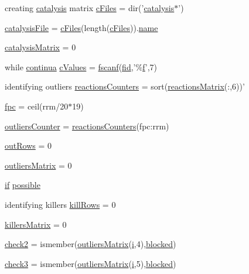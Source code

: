\begin{DoxyCompactItemize}
\item 
creating \hyperlink{a00012}{catalysis} matrix \hyperlink{a00030_a9eab57ccb42a39c704f47dc30e4f4515}{c\-Files} = dir('\hyperlink{a00012}{catalysis}$\ast$')
\item 
\hyperlink{a00030_a33e70cf5b45cb59005b82d30202f0b69}{catalysis\-File} = \hyperlink{a00030_a9eab57ccb42a39c704f47dc30e4f4515}{c\-Files}(length(\hyperlink{a00030_a9eab57ccb42a39c704f47dc30e4f4515}{c\-Files})).\hyperlink{a00027_abbf559a76fab59203496b0847ab9502a}{name}
\item 
\hyperlink{a00030_a0810027f58d6be965e44b7b84c44ace8}{catalysis\-Matrix} = 0
\item 
while \hyperlink{a00030_a9c951ebd5bc3f1adce943bee1255f4d6}{continua} \hyperlink{a00030_ad4ba7701967c1da20171228afccb7081}{c\-Values} = \hyperlink{a00025_a028ac102a731e62fb0a7439381f566c1}{fscanf}(\hyperlink{a00031_ae9011d40c6f13e68e6f07156e0da7c5d}{fid},'\%\hyperlink{a00025_a9c5a71c46b1abb8b7df5ebeac6c81535}{f}',7)
\item 
identifying outliers \hyperlink{a00030_aeea253cb98a56047ef20ceed86e2f0ea}{reactions\-Counters} = sort(\hyperlink{a00030_af998036b749d9fa6dd2365f9937279b6}{reactions\-Matrix}(\-:,6))'
\item 
\hyperlink{a00030_ab4459bcd3f7a26410560d9bd951f12bd}{fpc} = ceil(rrm/20$\ast$19)
\item 
\hyperlink{a00030_a7ec5b1f1e07b66a5d6fc972cb8b03c1f}{outliers\-Counter} = \hyperlink{a00030_aeea253cb98a56047ef20ceed86e2f0ea}{reactions\-Counters}(fpc\-:rrm)
\item 
\hyperlink{a00030_a60cfb1ca20cbbc81b85a8f56658b7c99}{out\-Rows} = 0
\item 
\hyperlink{a00030_ad8a18b407726bf44299c9bcf5d1389ff}{outliers\-Matrix} = 0
\item 
\hyperlink{a00030_a01d55766b8058903dd360b4bda71f9f5}{if} \hyperlink{a00030_a07c9e68cdbafe572c04d3112d64deb88}{possible}
\item 
identifying killers \hyperlink{a00030_a0e22d9868b850c50dfc13f5d28db8c30}{kill\-Rows} = 0
\item 
\hyperlink{a00030_a929016802e1ede2217a41240a6974fa6}{killers\-Matrix} = 0
\item 
\hyperlink{a00030_a98a8838a85ed24032563a44271b1525a}{check2} = ismember(\hyperlink{a00030_a9733b61dd859b1133aa3aa849cf70cbc}{outliers\-Matrix}(\hyperlink{a00071_ad3efca1ea6e3333daf30719ee0501862}{i},4),\hyperlink{a00030_a1faaaae288fc8ca4ed1751049aa2f84f}{blocked})
\item 
\hyperlink{a00030_adfd17509248a56986475a25ee50fe488}{check3} = ismember(\hyperlink{a00030_a9733b61dd859b1133aa3aa849cf70cbc}{outliers\-Matrix}(\hyperlink{a00071_ad3efca1ea6e3333daf30719ee0501862}{i},5),\hyperlink{a00030_a1faaaae288fc8ca4ed1751049aa2f84f}{blocked})

\end{DoxyCompactItemize}
